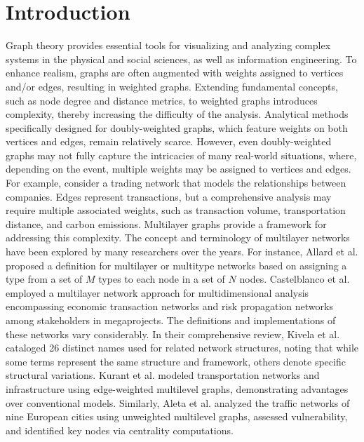 \documentclass[preprint,12pt,number]{elsarticle}
\theoremstyle{plain} %
\theoremstyle{definition} %
\begin{document}
\section{Introduction}\label{Sec:Introduction}
Graph theory provides essential tools for visualizing and analyzing complex systems in the physical and social sciences, as well as information engineering. To enhance realism, graphs are often augmented with weights assigned to vertices and/or edges, resulting in weighted graphs. Extending fundamental concepts, such as node degree and distance metrics, to weighted graphs introduces complexity, thereby increasing the difficulty of the analysis. Analytical methods specifically designed for doubly-weighted graphs, which feature weights on both vertices and edges, remain relatively scarce. However, even doubly-weighted graphs may not fully capture the intricacies of many real-world situations, where, depending on the event, multiple weights may be assigned to vertices and edges. For example, consider a trading network that models the relationships between companies. Edges represent transactions, but a comprehensive analysis may require multiple associated weights, such as transaction volume, transportation distance, and carbon emissions. Multilayer graphs provide a framework for addressing this complexity. The concept and terminology of multilayer networks have been explored by many researchers over the years. 
For instance, Allard et al. \cite{allard2009heterogeneous} proposed a definition for multilayer or multitype networks based on assigning a type from a set of $M$ types to each node in a set of $N$ nodes. Castelblanco et al. \cite{castelblanco2024combining} employed a multilayer network approach for multidimensional analysis encompassing economic transaction networks and risk propagation networks among stakeholders in megaprojects.
The definitions and implementations of these networks vary considerably. 
In their comprehensive review, Kivela et al. \cite{kivela2014} cataloged 26 distinct names used for related network structures,  noting that while some terms represent the same structure and framework,  others denote specific structural variations.
Kurant et al. \cite{PhysRevLett.96.138701} modeled transportation networks and infrastructure using edge-weighted multilevel graphs, demonstrating advantages over conventional models.
Similarly, Aleta et al. \cite{Aleta2016AMP} analyzed the traffic networks of nine European cities using unweighted multilevel graphs, assessed vulnerability, and identified key nodes via centrality computations. 
\end{document}
